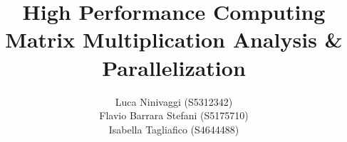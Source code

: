 \documentclass[10pt, a4paper]{article} %
\title{\huge{\textbf{High Performance Computing} \\ 
    Matrix Multiplication Analysis \& Parallelization}}
\author{Luca Ninivaggi (S5312342) \\
    Flavio Barrara Stefani (S5175710) \\
    Isabella Tagliafico (S4644488)
    \date{}
    }
\begin{document}
\maketitle


\tableofcontents





\newpage


\newpage


\newpage


\newpage


\newpage


\newpage

\newpage


\newpage
\nocite{*}
\printbibliography
\end{document}
